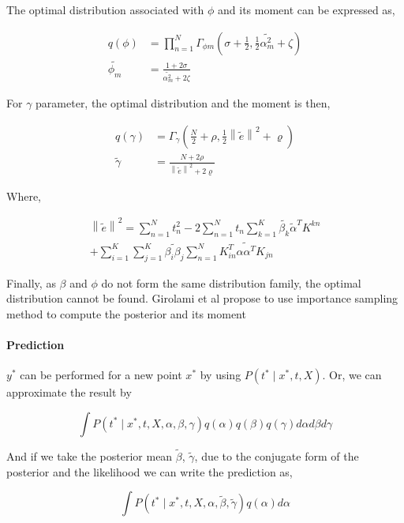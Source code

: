 \documentclass[11pt,a4paper]{article}
\begin{document}
The optimal distribution associated with $\phi$ and its moment can be expressed as,

\begin{align*}
    q(\phi) &= \prod^N_{n=1} \Gamma_{\phi m}\left( \sigma + \frac{1}{2}, \frac{1}{2}\widetilde{\alpha_m^2} + \zeta \right) \\
    \widetilde{\phi_m} &= \frac{1 + 2 \sigma}{\widetilde{\alpha^2_m} + 2 \zeta}
\end{align*}

For $\gamma$ parameter, the optimal distribution and the moment is then, 

\begin{align*}
    q(\gamma) &= \Gamma_{\gamma}\left( \frac{N}{2} + \rho, \frac{1}{2}\left\lVert \widetilde{e} \right\rVert^2  + \varrho \right) \\
    \widetilde{\gamma} &= \frac{N + 2 \rho}{\left\lVert \widetilde{e} \right\rVert^2 + 2 \varrho}
\end{align*}

Where, 

\begin{align*}
    \left\lVert \widetilde{e} \right\rVert^2 = \sum^N_{n=1} t^2_n - 2 \sum^N_{n=1} t_n \sum^K_{k=1} \widetilde{\beta_k}\widetilde{\alpha}^T K^{kn} \\ 
+ \sum^K_{i=1}\sum^K_{j=1} \widetilde{\beta_i \beta_j} \sum^N_{n=1}K_{in}^T\widetilde{\alpha \alpha^T}K_{jn}
\end{align*}

Finally, as $\beta$ and $\phi$ do not form the same distribution family, the optimal distribution cannot be found. Girolami et al propose to use importance sampling method to compute the posterior and its moment

\paragraph{Prediction} $y^*$ can be performed for a new point $x^*$ by using $P(t^* \mid x^*, t, X)$. Or, we can approximate the result by 

$$
\int P(t^* \mid x^*, t, X, \alpha, \beta, \gamma) q(\alpha)q(\beta)q(\gamma) d\alpha d\beta d\gamma 
$$

And if we take the posterior mean $\widetilde{\beta}$, $\widetilde{\gamma}$, due to the conjugate form of the posterior and the likelihood we can write the prediction as,

$$
\int P(t^* \mid x^*, t, X, \alpha, \widetilde{\beta}, \widetilde{\gamma}) q(\alpha)d\alpha 
$$
\end{document}
